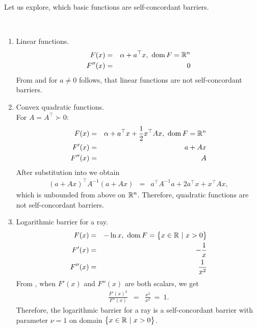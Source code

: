 Let us explore, which basic functions are self-concordant barriers.

\begin{example}~\\[-0.5cm]
  \begin{enumerate}
    \item Linear functions.
      \begin{eqnarray}
        F(x) &=& \alpha + a^\top x,\ \operatorname{dom} F = \mathbb{R}^n\\
        F''(x) &=& 0
      \end{eqnarray}
      From  and for $a \neq 0$ follows, that linear functions are not self-concordant barriers.

    \item Convex quadratic functions.\\
      For $A = A^\top \succ 0$:
      \begin{eqnarray}
        F(x) &=& \alpha + a^\top x + \frac{1}{2} x^\top Ax,\ \dom F = \R^n\\
        F'(x) &=& a + Ax\\
        F''(x) &=& A
      \end{eqnarray}
      After substitution into  we obtain
      \begin{eqnarray}
        (a + Ax)^\top A^{-1}(a + Ax) &=& a^\top A^{-1}a + 2a^\top x + x^\top Ax,
      \end{eqnarray}
      which is unbounded from above on $\mathbb{R}^n$. Therefore, quadratic functions are not self-concordant barriers.
      

    \item Logarithmic barrier for a ray.
      \begin{eqnarray}
        F(x) &=& -\ln x,\ \operatorname{dom} F = \big\{x\in\mathbb{R}\ |\ x > 0\big\}\\
        F'(x) &=& -\frac{1}{x}\\
        F''(x) &=& \frac{1}{x^2}
      \end{eqnarray}
      From , when $F'(x)$ and $F''(x)$ are both scalars, we get
      \begin{eqnarray}
        \frac{F'(x)^2}{F''(x)} &=& \frac{x^2}{x^2}\ =\ 1.
      \end{eqnarray}
      Therefore, the logarithmic barrier for a ray is a self-concordant barrier with parameter $\nu = 1$ on domain $\big\{x\in\mathbb{R}\ |\ x > 0\big\}$.
  \end{enumerate}
\end{example}

